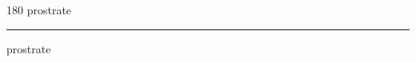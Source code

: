 
\begin{frame}
\begin{center}
\begin{turn}{180}
{\fontsize{2.5cm}{1em}\selectfont prostrate}
\end{turn}
\vspace{1em}\par  
\hrule
\vspace{1em}\par  
{\fontsize{2.5cm}{1em}\selectfont prostrate}
\end{center}
\end{frame}
